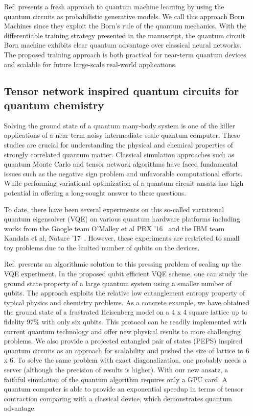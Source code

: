 \documentclass[]{article}
\begin{document}
Ref.\cite{Liu2018} presents a fresh approach to quantum machine learning by using the quantum circuits as probabilistic generative models. We call this approach Born Machines since they exploit the Born's rule of the quantum mechanics.
With the differentiable training strategy presented in the manuscript, the quantum circuit Born machine exhibits clear quantum advantage over classical neural networks. The proposed training approach is both practical for near-term quantum devices and scalable for future large-scale real-world applications.


\subsection{Tensor network inspired quantum circuits for quantum chemistry}
Solving the ground state of a quantum many-body system is one of the killer applications of a  near-term noisy intermediate scale quantum computer. These studies are crucial for understanding the physical and chemical properties of strongly correlated quantum matter. Classical simulation approaches such as quantum Monte Carlo and tensor network algorithms have faced fundamental issues such as the negative sign problem and unfavorable computational efforts. While performing variational optimization of a quantum circuit ansatz has high potential in offering a long-sought answer to these questions.   

To date, there have been several experiments on this so-called variational quantum eigensolver (VQE) on various quantum hardware platforms including works from the Google team O'Malley et al PRX '16~\cite{OMalley2016}  and the IBM team Kandala  et al, Nature '17~\cite{Kandala2017}.  However, these experiments are restricted to small toy problems due to the limited number of qubits on the devices.  

Ref.\cite{Liu2019} presents an algorithmic solution to this pressing problem of scaling up the VQE experiment.  In the proposed qubit efficient VQE scheme, one can study the ground state property of a large quantum system using a smaller number of qubits. The approach exploits the relative low entanglement entropy property of typical physics and chemistry problems. As a concrete example, we have obtained the ground state of a frustrated Heisenberg model on a 4 x 4 square lattice up to fidelity 97\% with only six qubits. This protocol can be readily implemented with current quantum technology and offer new physical results to more challenging problems. We also provide a projected entangled pair of states (PEPS) inspired quantum circuits as an approach for scalability and pushed the size of lattice to 6 x 6.
To solve the same problem with exact diagonalization, one probably needs a server (although the precision of results is higher). With our new ansatz, a faithful simulation of the quantum algorithm requires only a GPU card. A quantum computer is able to provide an exponential speedup in terms of tensor contraction comparing with a classical device, which demonstrates quantum advantage.
\end{document}
